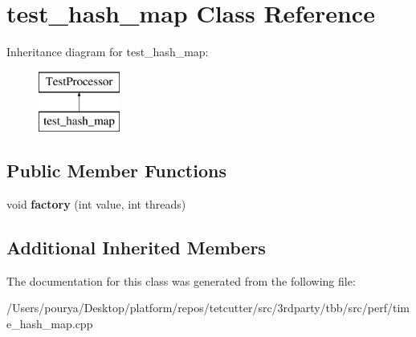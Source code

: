 \hypertarget{classtest__hash__map}{}\section{test\+\_\+hash\+\_\+map Class Reference}
\label{classtest__hash__map}
Inheritance diagram for test\+\_\+hash\+\_\+map\+:\begin{figure}[H]
\begin{center}
\leavevmode
\includegraphics[height=2.000000cm]{classtest__hash__map}
\end{center}
\end{figure}
\subsection*{Public Member Functions}
\begin{DoxyCompactItemize}
\item 
\hypertarget{classtest__hash__map_a670358ef567c2693b0bd604ec3fdb3f3}{}void {\bfseries factory} (int value, int threads)\label{classtest__hash__map_a670358ef567c2693b0bd604ec3fdb3f3}

\end{DoxyCompactItemize}
\subsection*{Additional Inherited Members}


The documentation for this class was generated from the following file\+:\begin{DoxyCompactItemize}
\item 
/\+Users/pourya/\+Desktop/platform/repos/tetcutter/src/3rdparty/tbb/src/perf/time\+\_\+hash\+\_\+map.\+cpp\end{DoxyCompactItemize}
